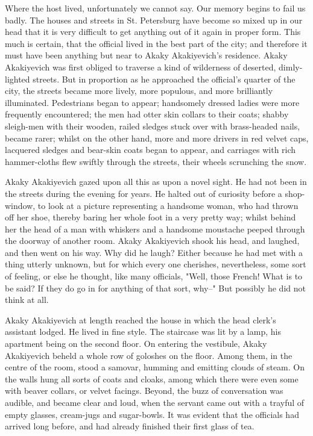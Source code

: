 Where the host lived, unfortunately we cannot say. Our memory begins
to fail us badly. The houses and streets in St. Petersburg have become
so mixed up in our head that it is very difficult to get anything out
of it again in proper form. This much is certain, that the official
lived in the best part of the city; and therefore it must have been
anything but near to Akaky Akakiyevich's residence. Akaky Akakiyevich
was first obliged to traverse a kind of wilderness of deserted,
dimly-lighted streets. But in proportion as he approached the
official's quarter of the city, the streets became more lively, more
populous, and more brilliantly illuminated. Pedestrians began to
appear; handsomely dressed ladies were more frequently encountered;
the men had otter skin collars to their coats; shabby sleigh-men with
their wooden, railed sledges stuck over with brass-headed nails,
became rarer; whilst on the other hand, more and more drivers in red
velvet caps, lacquered sledges and bear-skin coats began to appear,
and carriages with rich hammer-cloths flew swiftly through the
streets, their wheels scrunching the snow.

Akaky Akakiyevich gazed upon all this as upon a novel sight. He had
not been in the streets during the evening for years. He halted out of
curiosity before a shop-window, to look at a picture representing a
handsome woman, who had thrown off her shoe, thereby baring her whole
foot in a very pretty way; whilst behind her the head of a man with
whiskers and a handsome moustache peeped through the doorway of
another room. Akaky Akakiyevich shook his head, and laughed, and then
went on his way. Why did he laugh? Either because he had met with a
thing utterly unknown, but for which every one cherishes,
nevertheless, some sort of feeling, or else he thought, like many
officials, "Well, those French! What is to be said? If they do go in
for anything of that sort, why--" But possibly he did not think at
all.

Akaky Akakiyevich at length reached the house in which the head
clerk's assistant lodged. He lived in fine style. The staircase was
lit by a lamp, his apartment being on the second floor. On entering
the vestibule, Akaky Akakiyevich beheld a whole row of goloshes on the
floor. Among them, in the centre of the room, stood a samovar, humming
and emitting clouds of steam. On the walls hung all sorts of coats and
cloaks, among which there were even some with beaver collars, or
velvet facings. Beyond, the buzz of conversation was audible, and
became clear and loud, when the servant came out with a trayful of
empty glasses, cream-jugs and sugar-bowls. It was evident that the
officials had arrived long before, and had already finished their
first glass of tea.

